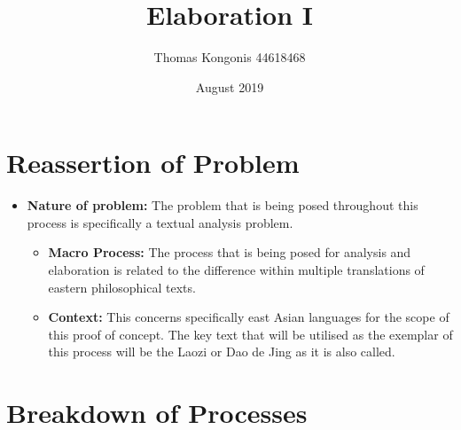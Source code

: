 \documentclass{article}
\title{Elaboration I}
\author{Thomas Kongonis 44618468}
\date{August 2019}
\begin{document}
\maketitle

\tableofcontents


\section{Reassertion of Problem}
\begin{itemize}

\item{\textbf{Nature of problem:} The problem that is being posed throughout this process is specifically a textual
analysis problem.}

\begin{itemize}

\item{\textbf{Macro Process:} The process that is being posed for analysis and elaboration is related to the difference within multiple translations of eastern philosophical texts.}

\item{\textbf{Context:} This concerns specifically east Asian languages for the scope of this proof of concept. The key text that will be utilised as the exemplar of this process will be the Laozi or Dao de Jing as it is also called.}

\end{itemize}

\end{itemize}


\section{Breakdown of Processes}
\end{document}
